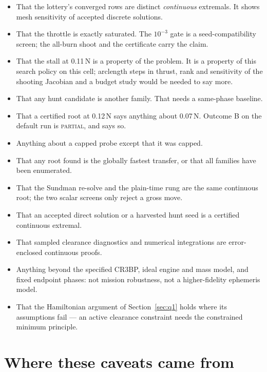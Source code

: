 \documentclass[11pt]{article}
\begin{document}
\begin{warn}
\begin{itemize}[nosep]
\item That the lottery's converged rows are distinct \emph{continuous}
      extremals. It shows mesh sensitivity of accepted discrete solutions.
\item That the throttle is exactly saturated. The $10^{-3}$ gate is a
      seed-compatibility screen; the all-burn shoot and the certificate carry
      the claim.
\item That the stall at 0.11\,N is a property of the problem. It is a
      property of this search policy on this cell; arclength steps in
      thrust, rank and sensitivity of the shooting Jacobian and a budget
      study would be needed to say more.
\item That any hunt candidate is another family. That needs a same-phase
      baseline.
\item That a certified root at 0.12\,N says anything about 0.07\,N. Outcome
      B on the default run is \textsc{partial}, and says so.
\item Anything about a capped probe except that it was capped.
\item That any root found is the globally fastest transfer, or that all
      families have been enumerated.
\item That the Sundman re-solve and the plain-time rung are the same
      continuous root; the two scalar screens only reject a gross move.
\item That an accepted direct solution or a harvested hunt seed is a
      certified continuous extremal.
\item That sampled clearance diagnostics and numerical integrations are
      error-enclosed continuous proofs.
\item Anything beyond the specified CR3BP, ideal engine and mass model, and
      fixed endpoint phases: not mission robustness, not a higher-fidelity
      ephemeris model.
\item That the Hamiltonian argument of Section~\ref{sec:q1} holds where its
      assumptions fail --- an active clearance constraint needs the
      constrained minimum principle.
\end{itemize}
\end{warn}

\section{Where these caveats came from}
\end{document}

